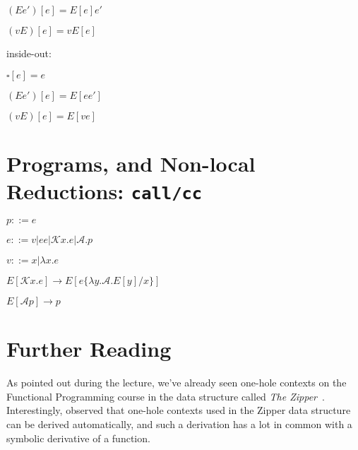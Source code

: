 $(E e')[e] = E[e] e'$

$(v E)[e] = v E[e]$

inside-out:

$\square[e] = e$

$(E e')[e] = E[e e']$

$(v E)[e] = E[v e]$


\section{Programs, and Non-local Reductions: \texttt{call/cc}}

$p ::= e$

$e ::= v | e e | \mathcal{K} x.e | \mathcal{A}.p$

$v ::= x | \lambda x.e$

$E[\mathcal{K} x.e] \rightarrow E[e\{\lambda y.\mathcal{A}.E[y]/x\}]$

$E[\mathcal{A} p] \rightarrow p$

\section{Further Reading}

As pointed out during the lecture, we've already seen one-hole contexts
on the Functional Programming course
in the data structure called \emph{The Zipper}~\citep{Huet97}.
Interestingly, \citet{McBride} observed that one-hole contexts used
in the Zipper data structure can be derived automatically,
and such a derivation has a lot in common with
a symbolic derivative of a function.
